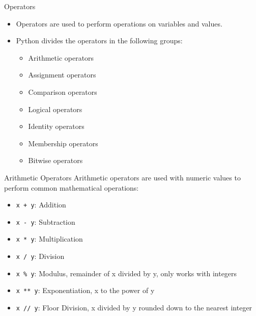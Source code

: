 \documentclass[aspectratio=169]{beamer}
\begin{document}
\begin{frame}{Operators}
    \begin{itemize}
        \item Operators are used to perform operations on variables and values.
        \item Python divides the operators in the following groups:
              \begin{itemize}
                  \item Arithmetic operators
                  \item Assignment operators
                  \item Comparison operators
                  \item Logical operators
                  \item Identity operators
                  \item Membership operators
                  \item Bitwise operators
              \end{itemize}
    \end{itemize}
\end{frame}

\begin{frame}{Arithmetic Operators}
    Arithmetic operators are used with numeric values to perform common mathematical operations:
    \begin{itemize}
        \item \texttt{x + y}: Addition
        \item \texttt{x - y}: Subtraction
        \item \texttt{x * y}: Multiplication
        \item \texttt{x / y}: Division
        \item \texttt{x \% y}: Modulus, remainder of x divided by y, only works with integers
        \item \texttt{x ** y}: Exponentiation, x to the power of y
        \item \texttt{x // y}: Floor Division, x divided by y rounded down to the nearest integer
    \end{itemize}
\end{frame}
\end{document}
